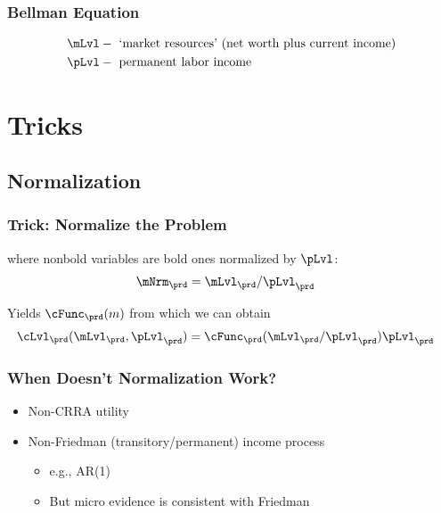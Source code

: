 \documentclass{beamer}
\begin{document}
\begin{frame}[label=vrecurse]
\frametitle{\large\textbf{Bellman Equation}}



\begin{equation*}\begin{gathered}\begin{aligned}
   \mLvl  & - \text{ `market resources' (net worth plus current income)}
\\ \pLvl  & - \text{ permanent labor income }
\end{aligned}\end{gathered}\end{equation*}

\end{frame}

\section{Tricks}
\subsection{Normalization}
\begin{frame}[label=Normalize]
\frametitle{\large\textbf{Trick: Normalize the Problem}}



where nonbold variables are bold ones normalized by $\pLvl$:
\begin{equation}\begin{gathered}\begin{aligned}
\mNrm_{\prd}  & = \mLvl_{\prd}/\pLvl_{\prd}
\end{aligned}\end{gathered}\end{equation}

Yields $\cFunc_{\prd}(m)$ from which we can obtain
\begin{equation}\begin{gathered}\begin{aligned}
  \cLvl_{\prd}(\mLvl_{\prd},\pLvl_{\prd})  & = \cFunc_{\prd}(\mLvl_{\prd}/\pLvl_{\prd})\pLvl_{\prd}
\end{aligned}\end{gathered}\end{equation}

\end{frame}

\begin{frame}[label=NormalizeWhenNot]
\frametitle{\large\textbf{When Doesn't Normalization Work?}}

\begin{itemize}
\item Non-CRRA utility
\item Non-Friedman (transitory/permanent) income process
\begin{itemize}
\item e.g., AR(1)
\item But micro evidence is consistent with Friedman
\end{itemize}
\end{itemize}

\end{frame}
\end{document}
